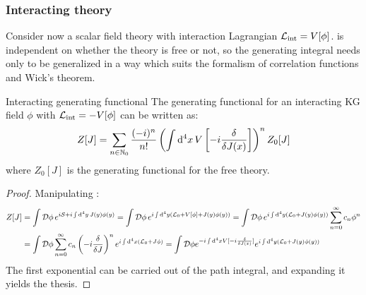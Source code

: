 \subsubsection{Interacting theory}

Consider now a scalar field theory with interaction Lagrangian $ \mathcal{L}_\text{int} = V[\phi] $.  is independent on whether the theory is free or not, so the generating integral needs only to be generalized in a way which suits the formalism of correlation functions and Wick's theorem.

\begin{proposition}{Interacting generating functional}{}
  The generating functional for an interacting KG field $ \phi $ with $ \mathcal{L}_\text{int} = - V[\phi] $ can be written as:
  \begin{equation}
    Z[J] = \sum_{n \in \mathbb{N}_0} \frac{(-i)^n}{n!} \left( \int \mathrm{d}^4x\, V \left[ -i \frac{\delta}{\delta J(x)} \right] \right)^n Z_0[J]
    \label{eq:z-int}
  \end{equation}
  where $ Z_0[J] $ is the generating functional for the free theory.
\end{proposition}

\begin{proofbox}
  \begin{proof}
    Manipulating :
    \begin{equation*}
      \begin{split}
        Z[J]
        & = \int \mathcal{D}\phi\, e^{i\mathcal{S} + i \int \mathrm{d}^4y\, J(y) \phi(y)} = \int \mathcal{D}\phi\, e^{i \int \mathrm{d}^4y \left( \mathcal{L}_0 + V[\phi] + J(y) \phi(y) \right)} = \int \mathcal{D}\phi\, e^{i \int \mathrm{d}^4y \left( \mathcal{L}_0 + J(y) \phi(y) \right)} \sum_{n = 0}^\infty c_n \phi^n \\
        & = \int \mathcal{D}\phi \sum_{n = 0}^\infty c_n \left( -i \frac{\delta}{\delta J} \right)^n e^{i \int \mathrm{d}^4x \left( \mathcal{L}_0 + J \phi \right)} = \int \mathcal{D} \phi e^{-i \int \mathrm{d}^4x V[-i \frac{\delta}{\delta J(x)}]} e^{i \int \mathrm{d}^4y \left( \mathcal{L}_0 + J(y) \phi(y) \right)}
      \end{split}
    \end{equation*}
    The first exponential can be carried out of the path integral, and expanding it yields the thesis.
  \end{proof}
\end{proofbox}

